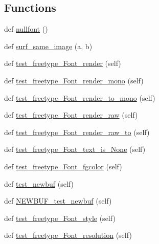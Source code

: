 \subsection*{Functions}
\begin{DoxyCompactItemize}
\item 
def \hyperlink{namespacepygame_1_1tests_1_1freetype__test_a46ac76385a5acd7ad03ac475fc510f94}{nullfont} ()
\item 
def \hyperlink{namespacepygame_1_1tests_1_1freetype__test_a38fec7c53a64daa069035c3cbce22438}{surf\+\_\+same\+\_\+image} (a, b)
\item 
def \hyperlink{namespacepygame_1_1tests_1_1freetype__test_abca519a7b38144cde03737c6243683d3}{test\+\_\+freetype\+\_\+\+Font\+\_\+render} (self)
\item 
def \hyperlink{namespacepygame_1_1tests_1_1freetype__test_abc8ccfafaf3546c63c952a08a7da4ded}{test\+\_\+freetype\+\_\+\+Font\+\_\+render\+\_\+mono} (self)
\item 
def \hyperlink{namespacepygame_1_1tests_1_1freetype__test_a7c909aaa33af532c490674660d5a64b6}{test\+\_\+freetype\+\_\+\+Font\+\_\+render\+\_\+to\+\_\+mono} (self)
\item 
def \hyperlink{namespacepygame_1_1tests_1_1freetype__test_a3b95654c0f95d1bf0dc886f1691e3aef}{test\+\_\+freetype\+\_\+\+Font\+\_\+render\+\_\+raw} (self)
\item 
def \hyperlink{namespacepygame_1_1tests_1_1freetype__test_a7cfe56fd8fc9641774c2cfffdef3a682}{test\+\_\+freetype\+\_\+\+Font\+\_\+render\+\_\+raw\+\_\+to} (self)
\item 
def \hyperlink{namespacepygame_1_1tests_1_1freetype__test_ae1293f1164f8e3b5531746c0210f6bee}{test\+\_\+freetype\+\_\+\+Font\+\_\+text\+\_\+is\+\_\+\+None} (self)
\item 
def \hyperlink{namespacepygame_1_1tests_1_1freetype__test_aef4e25239a57970234c21bf954e1b9c8}{test\+\_\+freetype\+\_\+\+Font\+\_\+fgcolor} (self)
\item 
def \hyperlink{namespacepygame_1_1tests_1_1freetype__test_aeed299e4a7376977c9244fa4bedffb73}{test\+\_\+newbuf} (self)
\item 
def \hyperlink{namespacepygame_1_1tests_1_1freetype__test_a98faf7cba8aa09477f4a3833be78f7b4}{N\+E\+W\+B\+U\+F\+\_\+test\+\_\+newbuf} (self)
\item 
def \hyperlink{namespacepygame_1_1tests_1_1freetype__test_a40ead525362dd76fd33885f46f7cb0dc}{test\+\_\+freetype\+\_\+\+Font\+\_\+style} (self)
\item 
def \hyperlink{namespacepygame_1_1tests_1_1freetype__test_ad0fac6eed54917809013484e91241420}{test\+\_\+freetype\+\_\+\+Font\+\_\+resolution} (self)

\end{DoxyCompactItemize}
